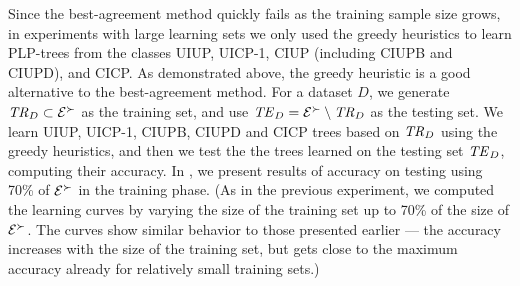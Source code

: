 Since the best-agreement method quickly fails as the training sample size 
grows, in experiments with large learning sets we only used the greedy 
heuristics to learn PLP-trees from the classes UIUP, UICP-1, CIUP 
(including CIUPB and CIUPD), and CICP.
As demonstrated above, the greedy heuristic is a good alternative to the 
best-agreement method. For a dataset $D$, we generate $\mathit{TR}_{D}\subset 
\mathcal{E}^\succ$ as the training set, and use $\mathit{TE}_D =\mathcal{E}^\succ\setminus \mathit{TR}_D$ 
as the testing set. We learn UIUP, UICP-1, CIUPB, CIUPD and CICP trees based on
$\mathit{TR}_D$ 
using the greedy heuristics, and then we test the the trees learned on
the testing set $\mathit{TE}_D$, computing their accuracy. In , we 
present results of accuracy on testing using 70\% of $\mathcal{E}^\succ$
in the training phase. (As in the previous experiment, we computed the 
learning curves by varying the size of the training set up to 70\% of the 
size of $\mathcal{E}^\succ$. The curves show similar behavior to those presented
earlier --- the accuracy increases with the size of the training set, but
gets close to the maximum accuracy already for relatively small training 
sets.) 

